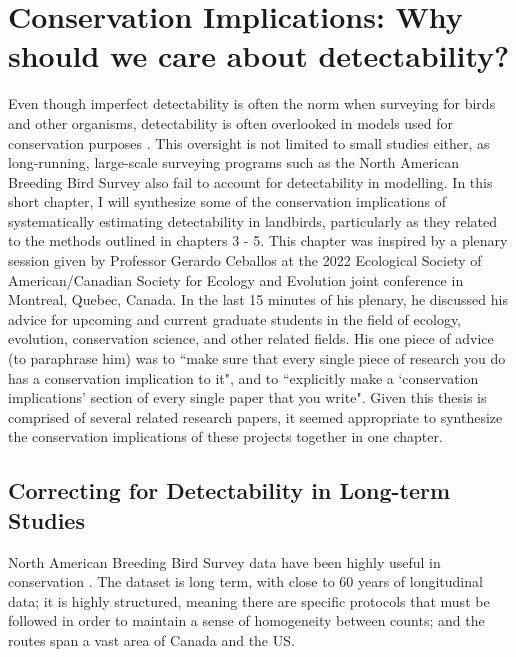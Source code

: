 \chapter{Conservation Implications: Why should we care about detectability?}

\par Even though imperfect detectability is often the norm when surveying for birds and other organisms, detectability is often overlooked in models used for conservation purposes \citep{bennett_how_2024}.
This oversight is not limited to small studies either, as long-running, large-scale surveying programs such as the North American Breeding Bird Survey also fail to account for detectability in modelling.
In this short chapter, I will synthesize some of the conservation implications of systematically estimating detectability in landbirds, particularly as they related to the methods outlined in chapters 3 - 5. 
This chapter was inspired by a plenary session given by Professor Gerardo Ceballos at the 2022 Ecological Society of American/Canadian Society for Ecology and Evolution joint conference in Montreal, Quebec, Canada.
In the last 15 minutes of his plenary, he discussed his advice for upcoming and current graduate students in the field of ecology, evolution, conservation science, and other related fields.
His one piece of advice (to paraphrase him) was to ``make sure that every single piece of research you do has a conservation implication to it", and to ``explicitly make a `conservation implications' section of every single paper that you write".
Given this thesis is comprised of several related research papers, it seemed appropriate to synthesize the conservation implications of these projects together in one chapter.

\section{Correcting for Detectability in Long-term Studies}

\par North American Breeding Bird Survey data have been highly useful in conservation \citep{hudson_role_2017}.
The dataset is long term, with close to 60 years of longitudinal data; it is highly structured, meaning there are specific protocols that must be followed in order to maintain a sense of homogeneity between counts; and the routes span a vast area of Canada and the US.

